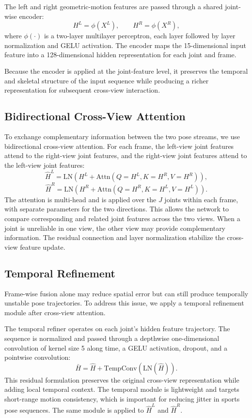\documentclass[preprint,12pt]{elsarticle}
\begin{document}
The left and right geometric-motion features are passed through a shared joint-wise encoder:
\[
H^{L} = \phi(X^{L}),
\qquad
H^{R} = \phi(X^{R}),
\]
where \(\phi(\cdot)\) is a two-layer multilayer perceptron, each layer followed by layer normalization and GELU activation. The encoder maps the 15-dimensional input feature into a 128-dimensional hidden representation for each joint and frame.

Because the encoder is applied at the joint-feature level, it preserves the temporal and skeletal structure of the input sequence while producing a richer representation for subsequent cross-view interaction.

\subsection{Bidirectional Cross-View Attention}
\label{subsec:cross_view_attention}

To exchange complementary information between the two pose streams, we use bidirectional cross-view attention. For each frame, the left-view joint features attend to the right-view joint features, and the right-view joint features attend to the left-view joint features:
\[
\hat{H}^{L}
=
\mathrm{LN}\!\left(H^{L}+\mathrm{Attn}(Q=H^{L}, K=H^{R}, V=H^{R})\right),
\]
\[
\hat{H}^{R}
=
\mathrm{LN}\!\left(H^{R}+\mathrm{Attn}(Q=H^{R}, K=H^{L}, V=H^{L})\right).
\]
The attention is multi-head and is applied over the \(J\) joints within each frame, with separate parameters for the two directions. This allows the network to compare corresponding and related joint features across the two views. When a joint is unreliable in one view, the other view may provide complementary information. The residual connection and layer normalization stabilize the cross-view feature update.

\subsection{Temporal Refinement}
\label{subsec:temporal_refinement}

Frame-wise fusion alone may reduce spatial error but can still produce temporally unstable pose trajectories. To address this issue, we apply a temporal refinement module after cross-view attention.

The temporal refiner operates on each joint's hidden feature trajectory. The sequence is normalized and passed through a depthwise one-dimensional convolution of kernel size 5 along time, a GELU activation, dropout, and a pointwise convolution:
\[
\bar{H} = \hat{H} + \mathrm{TempConv}(\mathrm{LN}(\hat{H})).
\]
This residual formulation preserves the original cross-view representation while adding local temporal context. The temporal module is lightweight and targets short-range motion consistency, which is important for reducing jitter in sports pose sequences. The same module is applied to \(\hat{H}^{L}\) and \(\hat{H}^{R}\).
\end{document}
